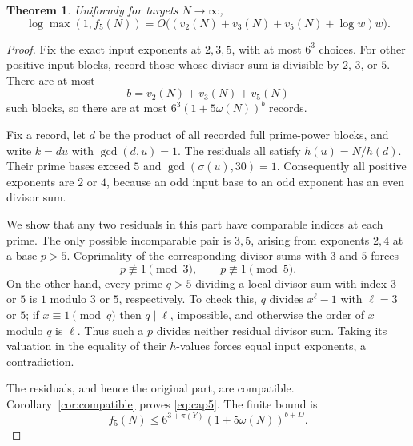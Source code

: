 \documentclass[11pt]{article}
\newtheorem{theorem}{Theorem}[section]
\begin{document}
\begin{theorem}\label{thm:cap5}
Uniformly for targets $N\to\infty$,
\begin{equation}\label{eq:cap5}
 \boxed{\log\max(1,f_5(N))
 =O\bigl((v_2(N)+v_3(N)+v_5(N)+\log w)w\bigr).}
\end{equation}
\end{theorem}
\begin{proof}
Fix the exact input exponents at $2,3,5$, with at most $6^3$ choices. For other positive input blocks, record those whose divisor sum is divisible by $2$, $3$, or $5$. There are at most
\[
 b=v_2(N)+v_3(N)+v_5(N)
\]
such blocks, so there are at most $6^3(1+5\omega(N))^b$ records.

Fix a record, let $d$ be the product of all recorded full prime-power blocks, and write $k=du$ with $\gcd(d,u)=1$. The residuals all satisfy $h(u)=N/h(d)$. Their prime bases exceed $5$ and $\gcd(\sigma(u),30)=1$. Consequently all positive exponents are $2$ or $4$, because an odd input base to an odd exponent has an even divisor sum.

We show that any two residuals in this part have comparable indices at each prime. The only possible incomparable pair is $3,5$, arising from exponents $2,4$ at a base $p>5$. Coprimality of the corresponding divisor sums with $3$ and $5$ forces
\[
 p\not\equiv1\pmod3,\qquad p\not\equiv1\pmod5.
\]
On the other hand, every prime $q>5$ dividing a local divisor sum with index $3$ or $5$ is $1$ modulo $3$ or $5$, respectively. To check this, $q$ divides $x^\ell-1$ with $\ell=3$ or $5$; if $x\equiv1\pmod q$ then $q\mid\ell$, impossible, and otherwise the order of $x$ modulo $q$ is $\ell$. Thus such a $p$ divides neither residual divisor sum. Taking its valuation in the equality of their $h$-values forces equal input exponents, a contradiction.

The residuals, and hence the original part, are compatible. Corollary~\ref{cor:compatible} proves \eqref{eq:cap5}. The finite bound is
\[
 f_5(N)\le6^{3+\pi(Y)}(1+5\omega(N))^{b+D}.
\]
\end{proof}
\end{document}
